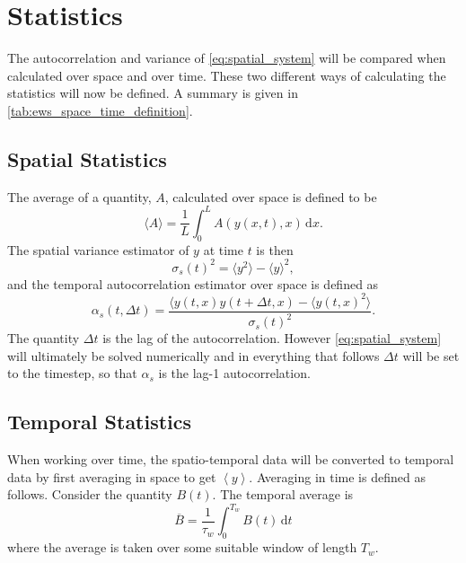 \section{Statistics}
The autocorrelation and variance of \cref{eq:spatial_system} will be compared when calculated over space and over time. These two different ways of calculating the statistics  will now
be defined. A summary is given in \cref{tab:ews_space_time_definition}.

\subsection{Spatial Statistics}

The average of a quantity, $A$, calculated over space is defined to be
\begin{equation}
  \label{eq:definition_of_average}
  \langle A \rangle = \frac{1}{L}\int_0^L A(y(x,t),x) \,\mathrm{d}x.
\end{equation}
The spatial variance estimator of $y$ at time $t$ is then
\begin{equation}
  \label{eq:spatial_variance}
  \sigma_s(t)^2 = \langle y^2 \rangle - \langle y \rangle^2,
\end{equation}
and the temporal autocorrelation estimator over space is defined as
\begin{equation}
  \label{eq:spatial_autocorrelation}
  \alpha_s(t,\Delta t) = \frac{\langle y(t,x)y(t+\Delta t,x) - \langle y(t,x)^2 \rangle }{\sigma_s(t)^2}.
\end{equation}
The quantity $\Delta t$ is the lag of the autocorrelation. However \cref{eq:spatial_system} will ultimately be solved numerically and
in everything that follows $\Delta t$ will be set to the timestep, so that $\alpha_s$ is the lag-1 autocorrelation.

\subsection{Temporal Statistics}
When working over time, the spatio-temporal data will be converted to temporal data by first averaging in space to get $\left\langle y \right\rangle$.
Averaging in time is defined as follows. Consider the quantity $B(t)$. The temporal average is
\begin{equation}
  \label{eq:definition_of_temporal_average}
  \overline{B} = \frac{1}{\tau_w}\int_0^{T_w}B(t)\,\mathrm{d}t
\end{equation}
where the average is taken over some suitable window of length $T_w$.

